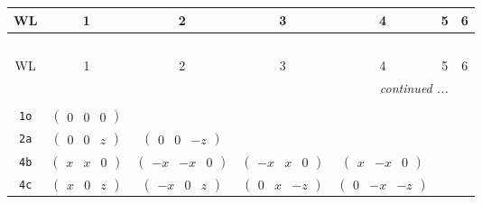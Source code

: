 \documentclass[fleqn,9pt,landscape]{jsarticle}
\begin{document}
\begin{center}
\renewcommand{\arraystretch}{1.2}
\begin{longtable}{ccccccc}
 \hline \hline
WL & 1 & 2 & 3 & 4 & 5 & 6 \\ \hline \endfirsthead

\multicolumn{6}{l}{\tablename\ \thetable{}} \\
 \hline \hline
WL & 1 & 2 & 3 & 4 & 5 & 6 \\ \hline \endhead

 \hline \hline
\multicolumn{6}{r}{\footnotesize\it continued ...} \\ \endfoot

 \hline \hline
\multicolumn{6}{r}{} \\ \endlastfoot

{\tt 1o} & $ \begin{pmatrix} 0 & 0 & 0 \end{pmatrix} $ & $  $ & $  $ & $  $ & $  $ & $  $ \\ \hline
{\tt 2a} & $ \begin{pmatrix} 0 & 0 & z \end{pmatrix} $ & $ \begin{pmatrix} 0 & 0 & - z \end{pmatrix} $ & $  $ & $  $ & $  $ & $  $ \\ \hline
{\tt 4b} & $ \begin{pmatrix} x & x & 0 \end{pmatrix} $ & $ \begin{pmatrix} - x & - x & 0 \end{pmatrix} $ & $ \begin{pmatrix} - x & x & 0 \end{pmatrix} $ & $ \begin{pmatrix} x & - x & 0 \end{pmatrix} $ & $  $ & $  $ \\ \hline
{\tt 4c} & $ \begin{pmatrix} x & 0 & z \end{pmatrix} $ & $ \begin{pmatrix} - x & 0 & z \end{pmatrix} $ & $ \begin{pmatrix} 0 & x & - z \end{pmatrix} $ & $ \begin{pmatrix} 0 & - x & - z \end{pmatrix} $ & $  $ & $  $ \\ \hline

\end{longtable}
\end{center}
\end{document}
